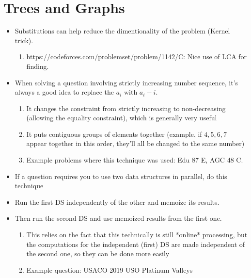 \section{Trees and Graphs}

\begin{itemize}
    \item Substitutions can help reduce the dimentionality of the problem (Kernel trick).
    \begin{enumerate}
        \item https://codeforces.com/problemset/problem/1142/C: Nice use of LCA for finding.
    \end{enumerate}
\end{itemize}

\begin{itemize}
    \item When solving a question involving strictly increasing number sequence, it's always a good idea to replace the $a_i$ with $a_i - i$.
    \begin{enumerate}
        \item It changes the constraint from strictly increasing to non-decreasing (allowing the equality constraint), which is generally very useful
        \item It puts contiguous groups of elements together (example, if $4, 5, 6, 7$ appear together in this order, they'll all be changed to the same number)
        \item Example problems where this technique was used: Edu 87 E, AGC 48 C.
    \end{enumerate}
\end{itemize}

\begin{itemize}
    \item If a question requires you to use two data structures in parallel, do this technique
    \item Run the first DS independently of the other and memoize its results.
    \item Then run the second DS and use memoized results from the first one.
    \begin{enumerate}
        \item This relies on the fact that this technically is still *online* processing, but the computations for the independent (first) DS are made independent of the second one, so they can be done more easily
        \item Example question: USACO 2019 USO Platinum Valleys 
    \end{enumerate}
\end{itemize}
